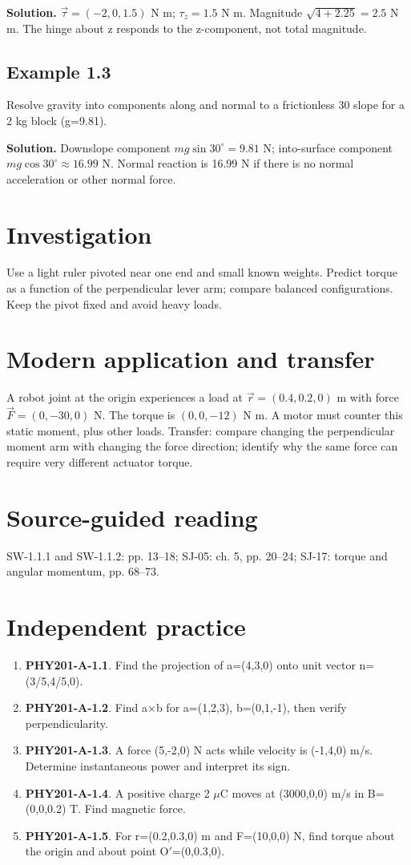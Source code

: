 \documentclass[11pt,a4paper,openany]{book}
\begin{document}
\textbf{Solution.} $\vec\tau=(-2,0,1.5)$ N m; $\tau_z=1.5$ N m. Magnitude $\sqrt{4+2.25}=2.5$ N m. The hinge about z responds to the z-component, not total magnitude.
\subsection*{Example 1.3}
Resolve gravity into components along and normal to a frictionless 30\textdegree{} slope for a 2 kg block (g=9.81).

\textbf{Solution.} Downslope component $mg\sin30^\circ=9.81$ N; into-surface component $mg\cos30^\circ\approx16.99$ N. Normal reaction is 16.99 N if there is no normal acceleration or other normal force.
\section{Investigation}
Use a light ruler pivoted near one end and small known weights. Predict torque as a function of the perpendicular lever arm; compare balanced configurations. Keep the pivot fixed and avoid heavy loads.
\section{Modern application and transfer}
A robot joint at the origin experiences a load at $\vec r=(0.4,0.2,0)$ m with force $\vec F=(0,-30,0)$ N. The torque is $(0,0,-12)$ N m. A motor must counter this static moment, plus other loads. Transfer: compare changing the perpendicular moment arm with changing the force direction; identify why the same force can require very different actuator torque.
\section{Source-guided reading}
SW-1.1.1 and SW-1.1.2: pp. 13–18; SJ-05: ch. 5, pp. 20–24; SJ-17: torque and angular momentum, pp. 68–73.
\section{Independent practice}
\begin{enumerate}
\item \textbf{PHY201-A-1.1}. Find the projection of a=(4,3,0) onto unit vector n=(3/5,4/5,0).
\item \textbf{PHY201-A-1.2}. Find a\ensuremath{\times}b for a=(1,2,3), b=(0,1,-1), then verify perpendicularity.
\item \textbf{PHY201-A-1.3}. A force (5,-2,0) N acts while velocity is (-1,4,0) m/s. Determine instantaneous power and interpret its sign.
\item \textbf{PHY201-A-1.4}. A positive charge 2 \ensuremath{\mu}C moves at (3000,0,0) m/s in B=(0,0,0.2) T. Find magnetic force.
\item \textbf{PHY201-A-1.5}. For r=(0.2,0.3,0) m and F=(10,0,0) N, find torque about the origin and about point O\ensuremath{\prime}=(0,0.3,0).
\end{enumerate}
\end{document}
